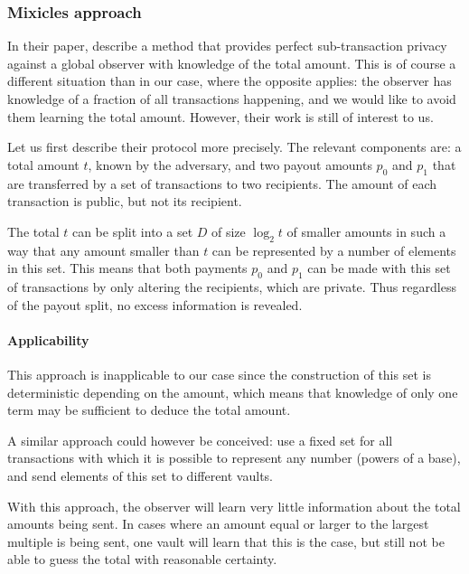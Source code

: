 \subsubsection{Mixicles approach}

In their  paper, \textcite{juels2019mixicles} describe a method that provides perfect sub-transaction privacy against a global observer with knowledge of the total amount.
This is of course a different situation than in our case, where the opposite applies: the observer has knowledge of a fraction of all transactions happening, and we would like to avoid them learning the total amount.
However, their work is still of interest to us.

Let us first describe their protocol more precisely.
The relevant components are: a total amount $t$, known by the adversary, and two payout amounts $p_0$ and $p_1$ that are transferred by a set of transactions to two recipients.
The amount of each transaction is public, but not its recipient.

The total $t$ can be split into a set $D$ of size $\log_2 t$ of smaller amounts in such a way that any amount smaller than $t$ can be represented by a number of elements in this set.
This means that both payments $p_0$ and $p_1$ can be made with this set of transactions by only altering the recipients, which are private.
Thus regardless of the payout split, no excess information is revealed.

\paragraph{Applicability}
\label{sec:tx_splitting_mixicles}

This approach is inapplicable to our case since the construction of this set is deterministic depending on the amount, which means that knowledge of only one term may be sufficient to deduce the total amount.

A similar approach could however be conceived: use a fixed set for all transactions with which it is possible to represent any number (powers of a base), and send elements of this set to different vaults.

With this approach, the observer will learn very little information about the total amounts being sent.
In cases where an amount equal or larger to the largest multiple is being sent, one vault will learn that this is the case, but still not be able to guess the total with reasonable certainty.

